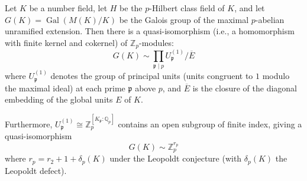 Let $K$ be a number field, let $H$ be the $p$-Hilbert class field of $K$, and let $G(K) = \operatorname{Gal}(M(K)/K)$ be the Galois group of the maximal $p$-abelian unramified extension. Then there is a quasi-isomorphism (i.e., a homomorphism with finite kernel and cokernel) of $\mathbb{Z}_p$-modules:
$$G(K) \sim \prod_{\mathfrak{p} \mid p} U_{\mathfrak{p}}^{(1)} \Big/ \overline{E}$$
where $U_{\mathfrak{p}}^{(1)}$ denotes the group of principal units (units congruent to $1$ modulo the maximal ideal) at each prime $\mathfrak{p}$ above $p$, and $\overline{E}$ is the closure of the diagonal embedding of the global units $E$ of $K$.

Furthermore, $U_{\mathfrak{p}}^{(1)} \cong \mathbb{Z}_p^{[K_{\mathfrak{p}}:\mathbb{Q}_p]}$ contains an open subgroup of finite index, giving a quasi-isomorphism
$$G(K) \sim \mathbb{Z}_p^{r_p}$$
where $r_p = r_2 + 1 + \delta_p(K)$ under the Leopoldt conjecture (with $\delta_p(K)$ the Leopoldt defect).
